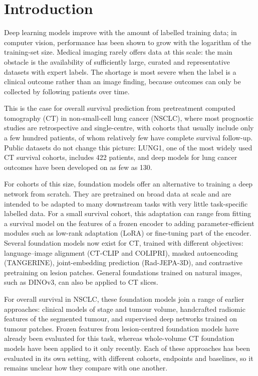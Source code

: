 \section{Introduction}\label{sec:intro}
Deep learning models improve with the amount of labelled training data; in computer vision, performance has been shown to grow with the logarithm of the training-set size.\cite{sun2017} Medical imaging rarely offers data at this scale: the main obstacle is the availability of sufficiently large, curated and representative datasets with expert labels.\cite{willemink2020} The shortage is most severe when the label is a clinical outcome rather than an image finding, because outcomes can only be collected by following patients over time.

This is the case for overall survival prediction from pretreatment computed tomography (CT) in non-small-cell lung cancer (NSCLC), where most prognostic studies are retrospective and single-centre, with cohorts that usually include only a few hundred patients, of whom relatively few have complete survival follow-up.\cite{lun2026,qin2026} Public datasets do not change this picture: LUNG1, one of the most widely used CT survival cohorts, includes 422 patients,\cite{aerts2014} and deep models for lung cancer outcomes have been developed on as few as 130.\cite{verma2024}

For cohorts of this size, foundation models offer an alternative to training a deep network from scratch. They are pretrained on broad data at scale and are intended to be adapted to many downstream tasks with very little task-specific labelled data.\cite{bommasani2021, moor2023} For a small survival cohort, this adaptation can range from fitting a survival model on the features of a frozen encoder to adding parameter-efficient modules such as low-rank adaptation (LoRA)\cite{hu2021} or fine-tuning part of the encoder. Several foundation models now exist for CT, trained with different objectives: language--image alignment (CT-CLIP and COLIPRI),\cite{hamamci2026ctclip,wald2025colipri} masked autoencoding (TANGERINE),\cite{mcconnell2026tangerine} joint-embedding prediction (Rad-JEPA-3D),\cite{trinh2026radjepa} and contrastive pretraining on lesion patches.\cite{pai2024} General foundations trained on natural images, such as DINOv3, can also be applied to CT slices.\cite{simeoni2025dinov3}

For overall survival in NSCLC, these foundation models join a range of earlier approaches: clinical models of stage and tumour volume, handcrafted radiomic features of the segmented tumour,\cite{aerts2014} and supervised deep networks trained on tumour patches.\cite{hosny2018} Frozen features from lesion-centred foundation models have already been evaluated for this task,\cite{pai2024,aerts2025tib} whereas whole-volume CT foundation models have been applied to it only recently.\cite{neukirch2026,allgower2026} Each of these approaches has been evaluated in its own setting, with different cohorts, endpoints and baselines, so it remains unclear how they compare with one another.

